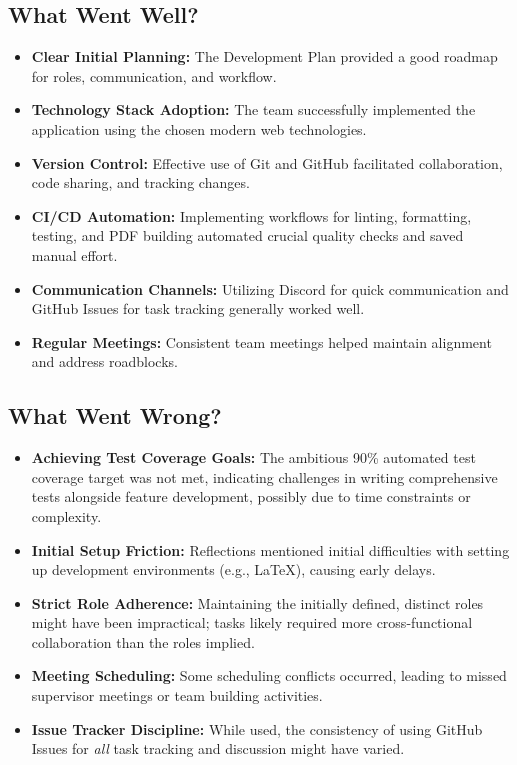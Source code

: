 \documentclass{article}
\begin{document}
\subsection{What Went Well?}

\begin{itemize}
  \item \textbf{Clear Initial Planning:} The Development Plan provided a good roadmap for roles, communication, and workflow.
  \item \textbf{Technology Stack Adoption:} The team successfully implemented the application using the chosen modern web technologies.
  \item \textbf{Version Control:} Effective use of Git and GitHub facilitated collaboration, code sharing, and tracking changes.
  \item \textbf{CI/CD Automation:} Implementing workflows for linting, formatting, testing, and PDF building automated crucial quality checks and saved manual effort.
  \item \textbf{Communication Channels:} Utilizing Discord for quick communication and GitHub Issues for task tracking generally worked well.
  \item \textbf{Regular Meetings:} Consistent team meetings helped maintain alignment and address roadblocks.
\end{itemize}

\subsection{What Went Wrong?}

\begin{itemize}
  \item \textbf{Achieving Test Coverage Goals:} The ambitious 90\% automated test coverage target was not met, indicating challenges in writing comprehensive tests alongside feature development, possibly due to time constraints or complexity.
  \item \textbf{Initial Setup Friction:} Reflections mentioned initial difficulties with setting up development environments (e.g., LaTeX), causing early delays.
  \item \textbf{Strict Role Adherence:} Maintaining the initially defined, distinct roles might have been impractical; tasks likely required more cross-functional collaboration than the roles implied.
  \item \textbf{Meeting Scheduling:} Some scheduling conflicts occurred, leading to missed supervisor meetings or team building activities.
  \item \textbf{Issue Tracker Discipline:} While used, the consistency of using GitHub Issues for \textit{all} task tracking and discussion might have varied.
\end{itemize}
\end{document}
